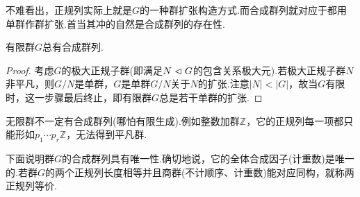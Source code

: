 不难看出，正规列实际上就是$G$的一种群扩张构造方式.而合成群列就对应于都用单群作群扩张.首当其冲的自然是合成群列的存在性.
\begin{lemma*}
	有限群$G$总有合成群列.
\end{lemma*}
\begin{proof}
	考虑$G$的{\heiti 极大正规子群}(即满足$N\vartriangleleft G$的包含关系极大元).若极大正规子群$N$非平凡，则$G/N$是单群，$G$是单群$G/N$关于$N$的扩张.注意$|N|<|G|$，故当$G$有限时，这一步骤最后终止，即有限群$G$总是若干单群的扩张.
\end{proof}
\begin{remark}
	无限群不一定有合成群列(哪怕有限生成).例如整数加群$\mathbb{Z}$，它的正规列每一项都只能形如$p_1\cdots p_r\mathbb{Z}$，无法得到平凡群.
\end{remark}

下面说明群$G$的合成群列具有唯一性.确切地说，它的全体合成因子(计重数)是唯一的.若群$G$的两个正规列长度相等并且商群(不计顺序、计重数)能对应同构，就称两正规列{\heiti 等价}.

